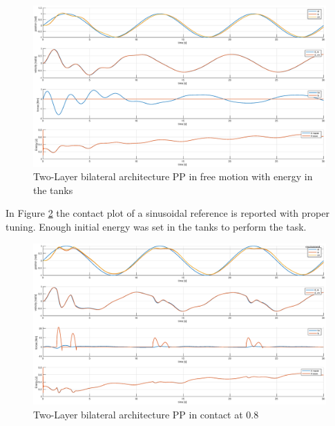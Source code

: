\documentclass[a4paper,12pt]{article}
\begin{document}
\begin{figure}[H]
    \begin{center}
        \hspace*{-4.5cm}
        \includegraphics[scale=0.5]{images/energy_pp_free.eps}
    \end{center}
    \caption{Two-Layer bilateral architecture PP in free motion with energy in the tanks}
    \label{fig:energy_pp_free}
\end{figure}

\newpage
In Figure \ref{fig:energy_pp_contact} the contact plot of a sinusoidal reference is reported with proper tuning. Enough initial energy was set in the tanks to perform the task.

\begin{figure}[H]
    \begin{center}
        \hspace*{-4.5cm}
        \includegraphics[scale=0.5]{images/energy_pp_contact.eps}
    \end{center}
    \caption{Two-Layer bilateral architecture PP in contact at 0.8}
    \label{fig:energy_pp_contact}
\end{figure}
\end{document}
